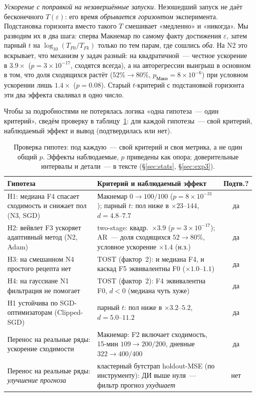 \documentclass[conference]{IEEEtran}
\begin{document}
\emph{Ускорение с поправкой на незавершённые запуски.} Незошедший запуск не
даёт бесконечного $T(\varepsilon)$: его время \emph{обрывается горизонтом}
эксперимента. Подстановка горизонта вместо такого $T$ смешивает «медленно»
и «никогда». Мы разводим их в два шага:
сперва Макнемар по самому факту достижения $\varepsilon$, затем парный $t$
на $\log_{10}(T_{F0}/T_{Fk})$ только по тем парам, где сошлись \emph{оба}. На
N2 это вскрывает, что механизм у задач разный: на квадратичной~--- честное
ускорение в $3.9\times$ ($p=3\times10^{-17}$, сходятся всегда), а на
авторегрессии выигрыш в основном в том, что доля сходящихся растёт
($52\%\to80\%$, $p_{\text{Макн}}=8\times10^{-6}$) при условном ускорении лишь
$1.4\times$ ($p=0.08$). Старый $t$-критерий с подстановкой горизонта эти два
эффекта сваливал в одно число.

Чтобы за подробностями не потерялась логика «одна гипотеза~--- один
критерий», сведём проверку в таблицу~\ref{tab:claims}: для каждой гипотезы~---
свой критерий, наблюдаемый эффект и вывод (подтвердилась или нет).

\begin{table}[t]
\centering\footnotesize
\setlength{\tabcolsep}{6pt}
\renewcommand{\arraystretch}{1.3}
\caption{Проверка гипотез: под каждую~--- свой критерий и своя метрика, а не
один общий $p$. Эффекты наблюдаемые, $p$ приведены как опора; доверительные
интервалы и детали~--- в тексте (§\ref{sec:stats}, §\ref{sec:exp3}).}
\label{tab:claims}
\begin{tabularx}{\textwidth}{@{}p{5.0cm} >{\raggedright\arraybackslash}X c@{}}
\toprule
Гипотеза & Критерий и наблюдаемый эффект & Подтв.? \\
\midrule
H1: медиана F4 спасает сходимость и снижает пол (N3, SGD)
  & Макнемар $0{\to}100/100$ ($p{=}8{\times}10^{-31}$); парный $t$: пол ниже в ${\times}23\text{--}144$, $d{=}4.8\text{--}7.7$
  & да \\
H2: вейвлет F3 ускоряет адаптивный метод (N2, Adam)
  & two-stage: квадр.\ ${\times}3.9$ ($p{=}3{\times}10^{-17}$); AR~--- доля сходящихся $52{\to}80\%$, условное ускорение ${\times}1.4$ (н.з.)
  & да \\
H3: на смешанном N4 простого рецепта нет
  & TOST (фактор~2): и медиана F4, и каскад F5 эквивалентны F0 (${\times}1.0\text{--}1.1$)
  & да \\
H4: на гауссиане N1 фильтрация не помогает
  & TOST (фактор~2): F4 эквивалентна F0, $d{<}0$ (медиана чуть хуже)
  & да \\
\midrule
H1 устойчива по SGD-оптимизаторам (Clipped-SGD)
  & парный $t$: пол ниже в ${\times}3.2\text{--}5.2$, $d{=}5.0\text{--}11.2$
  & да \\
Перенос на реальные ряды: ускорение сходимости
  & Макнемар: F2 включает сходимость, 15-мин $109{\to}200/200$, дневные $322{\to}400/400$
  & да \\
Перенос на реальные ряды: \emph{улучшение прогноза}
  & кластерный бутстрап holdout-MSE (по инструменту): ДИ выше нуля~--- фильтр прогноз \emph{ухудшает}
  & нет \\
\bottomrule
\end{tabularx}
\end{table}
\end{document}
